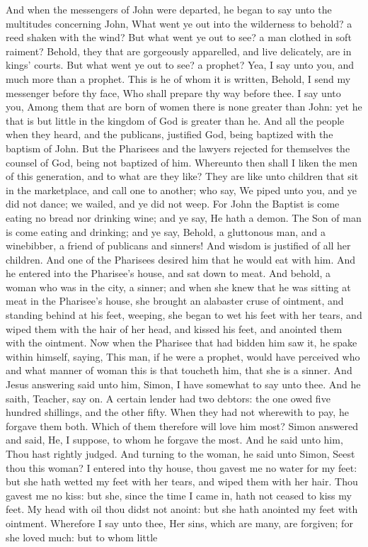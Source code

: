 And when the messengers of John were departed, he began to say unto the multitudes concerning John, What went ye out into the wilderness to behold? a reed shaken with the wind? But what went ye out to see? a man clothed in soft raiment? Behold, they that are gorgeously apparelled, and live delicately, are in kings’ courts. But what went ye out to see? a prophet? Yea, I say unto you, and much more than a prophet. This is he of whom it is written, Behold, I send my messenger before thy face, Who shall prepare thy way before thee.  I say unto you, Among them that are born of women there is none greater than John: yet he that is but little in the kingdom of God is greater than he. And all the people when they heard, and the publicans, justified God, being baptized with the baptism of John. But the Pharisees and the lawyers rejected for themselves the counsel of God, being not baptized of him. Whereunto then shall I liken the men of this generation, and to what are they like? They are like unto children that sit in the marketplace, and call one to another; who say, We piped unto you, and ye did not dance; we wailed, and ye did not weep. For John the Baptist is come eating no bread nor drinking wine; and ye say, He hath a demon. The Son of man is come eating and drinking; and ye say, Behold, a gluttonous man, and a winebibber, a friend of publicans and sinners! And wisdom is justified of all her children.  And one of the Pharisees desired him that he would eat with him. And he entered into the Pharisee’s house, and sat down to meat. And behold, a woman who was in the city, a sinner; and when she knew that he was sitting at meat in the Pharisee’s house, she brought an alabaster cruse of ointment, and standing behind at his feet, weeping, she began to wet his feet with her tears, and wiped them with the hair of her head, and kissed his feet, and anointed them with the ointment. Now when the Pharisee that had bidden him saw it, he spake within himself, saying, This man, if he were a prophet, would have perceived who and what manner of woman this is that toucheth him, that she is a sinner. And Jesus answering said unto him, Simon, I have somewhat to say unto thee. And he saith, Teacher, say on. A certain lender had two debtors: the one owed five hundred shillings, and the other fifty. When they had not wherewith to pay, he forgave them both. Which of them therefore will love him most? Simon answered and said, He, I suppose, to whom he forgave the most. And he said unto him, Thou hast rightly judged. And turning to the woman, he said unto Simon, Seest thou this woman? I entered into thy house, thou gavest me no water for my feet: but she hath wetted my feet with her tears, and wiped them with her hair. Thou gavest me no kiss: but she, since the time I came in, hath not ceased to kiss my feet. My head with oil thou didst not anoint: but she hath anointed my feet with ointment. Wherefore I say unto thee, Her sins, which are many, are forgiven; for she loved much: but to whom little 